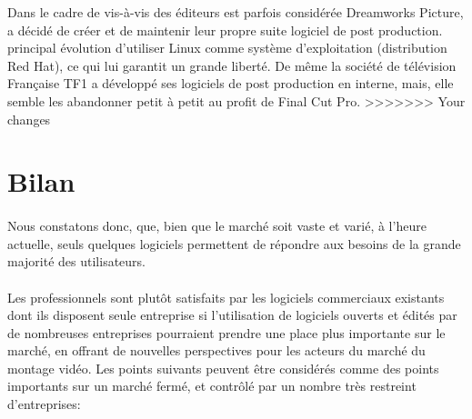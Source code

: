 \begin{itemize}
Dans le cadre de %
vis-à-vis des éditeurs est parfois considérée %
Dreamworks Picture, a décidé de créer et de maintenir leur propre
suite logiciel \cite {Dreamworks} de post production. %
principal %
évolution %
d'utiliser Linux comme système d'exploitation (distribution Red Hat),
ce qui lui garantit un grande liberté. De même la société
de télévision Française TF1 a développé ses logiciels de post
production en interne, mais, elle semble les abandonner petit à petit
au profit de Final Cut Pro.
>>>>>>> Your changes

\newpage

\section {Bilan}

\paragraph { }

Nous constatons donc, que, bien que le marché soit vaste et varié,
à l'heure actuelle, seuls quelques logiciels permettent de répondre
aux besoins de la grande majorité des utilisateurs.

\paragraph{}

Les professionnels sont plutôt satisfaits par les logiciels commerciaux
existants dont ils disposent %
seule entreprise %
si l'utilisation de logiciels ouverts et édités par de nombreuses
entreprises pourraient prendre une place plus importante sur le
marché, en offrant de nouvelles perspectives pour les acteurs du marché
du montage vidéo. Les points suivants peuvent être considérés comme
des points importants sur un marché fermé, et contrôlé par un nombre
très restreint d'entreprises:


\end{itemize}
